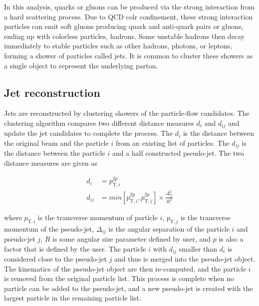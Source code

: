 In this analysis, quarks or gluons can be produced via the strong interaction from a hard scattering process.
Due to QCD colr confinement, these strong interaction particles can emit soft gluons producing quark and anti-quark pairs or gluons, ending up with colorless particles, hadrons.
Some unstable hadrons then decay immediately to stable particles such as other hadrons, photons, or leptons, forming a shower of particles called jets.
It is common to cluster these showers as a single object to represent the underlying parton.

\subsection{Jet reconstruction}
Jets are reconstructed by clustering showers of the particle-flow candidates.
The clustering algorithm compares two different distance measures $d_i$ and $d_{ij}$ and update the jet candidates to complete the process.
The $d_i$ is the distance between the original beam and the particle $i$ from an existing list of particles.
The $d_{ij}$ is the distance between the particle $i$ and a half constructed pseudo-jet.
The two distance measures are given as
\begin{linenomath}\begin{equation}\begin{aligned}\label{eq:reco_anti_kt}
    d_{i}  &= p_{\mathrm{T},i}^{2p}  \\
    d_{ij} &= min[p_{\mathrm{T},i}^{2p}, p_{\mathrm{T},j}^{2p}] \times \frac{\Delta^2_{ij}}{R^2}
\end{aligned}\end{equation}\end{linenomath}
where $p_{\mathrm{T},i}$ is the transverse momentum of particle $i$, $p_{\mathrm{T},j}$ is the transverse momentum of the pseudo-jet, $\Delta_{ij}$ is the angular separation of the particle $i$ and pseudo-jet $j$, $R$ is some angular size parameter defined by user, and $p$ is also a factor that is defined by the user.
The particle $i$ with $d_{ij}$ smaller than $d_i$ is considered close to the pseudo-jet $j$ and thus is merged into the pseudo-jet object.
The kinematics of the pseudo-jet object are then re-computed, and the particle $i$ is removed from the original particle list.
This process is complete when no particle can be added to the pseudo-jet, and a new pseudo-jet is created with the largest \PT particle in the remaining particle list.

